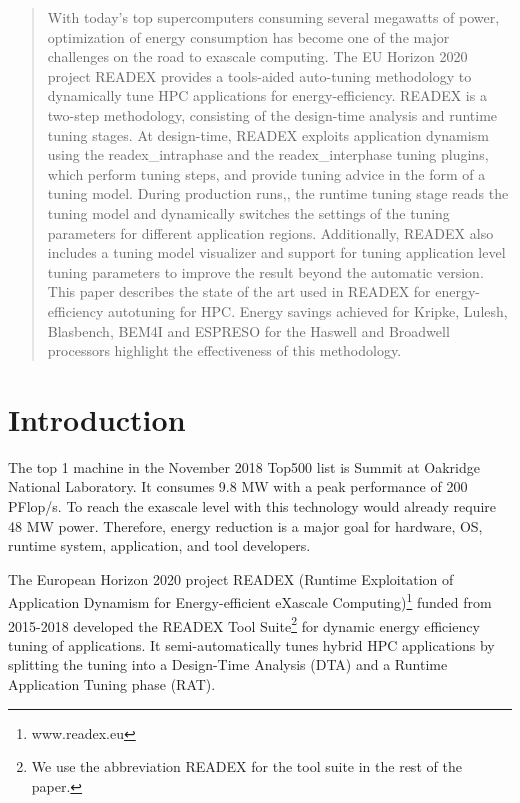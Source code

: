 \documentclass[runningheads]{llncs}
\begin{document}
\begin{abstract}
With today's top supercomputers consuming several megawatts of power, optimization of energy consumption has become one of the major challenges on the road to exascale computing.
The EU Horizon 2020 project READEX provides a tools-aided auto-tuning methodology to dynamically tune HPC applications for energy-efficiency. READEX is a two-step methodology, consisting of the design-time analysis and runtime tuning stages. At design-time, READEX exploits application dynamism using the readex\_intraphase and the readex\_interphase tuning plugins, which perform tuning steps, and provide tuning advice in the form of a tuning model. During production runs,, the runtime tuning stage reads the tuning model and  dynamically switches the settings of the tuning parameters for different application regions. Additionally, READEX also includes a tuning model visualizer and support for tuning application level tuning parameters to improve the result beyond the automatic version. This paper describes the state of the art used in READEX for energy-efficiency autotuning for HPC. Energy savings achieved for Kripke, Lulesh, Blasbench, BEM4I and ESPRESO for the Haswell and Broadwell processors highlight the effectiveness of this methodology.

\end{abstract}

\section{Introduction} \label{sec:introduction}

The top 1 machine in the November 2018 Top500 list is Summit at Oakridge National Laboratory. It consumes 9.8 MW with a peak performance of 200 PFlop/s. To reach the exascale level with this technology would already require 48 MW power. Therefore, energy reduction is a major goal for hardware, OS, runtime system, application, and tool developers. 

The European Horizon 2020 project READEX (Runtime Exploitation of Application Dynamism for Energy-efficient eXascale Computing)\footnote{www.readex.eu} funded from 2015-2018 developed the READEX Tool Suite\footnote{We use the abbreviation READEX for the tool suite in the rest of the paper.} for dynamic energy efficiency tuning of applications. It semi-automatically tunes hybrid HPC applications by splitting the tuning into a Design-Time Analysis (DTA) and a Runtime Application Tuning phase (RAT). 
\end{document}
